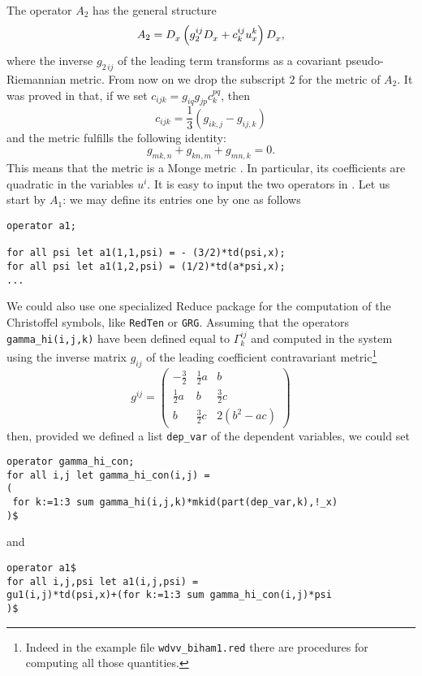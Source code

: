 The operator $A_2$ has the general structure
\begin{equation}
  A_2=D_x^{}\left(g^{ij}_2D_x^{}+c_{k}^{ij}u_{x}^{k}\right)D_x^{},  \label{casimir}
\end{equation}
where the inverse $g_{2\,ij}$ of the leading term transforms as a covariant
pseudo-Riemannian metric. From now on we drop the subscript $2$ for the metric
of $A_2$. It was proved in \cite{Ferapontov:2014} that, if we set
$c_{ijk}=g_{iq}g_{jp}c_{k}^{pq}$, then
\begin{displaymath}
  c_{ijk}=\frac{1}{3}(g_{ik,j}-g_{ij,k})
\end{displaymath}
and the metric fulfills the following identity:
\begin{equation}
  g_{mk,n}+g_{kn,m}+g_{mn,k}=0.
  \label{Killing}
\end{equation}
This means that the metric is a Monge metric \cite{Ferapontov:2014}. In particular, its
coefficients are quadratic in the variables $u^i$.
It is easy to input the two operators in \cde. Let us start by $A_1$: we may
define its entries one by one as follows
\begin{verbatim}
operator a1;

for all psi let a1(1,1,psi) = - (3/2)*td(psi,x);
for all psi let a1(1,2,psi) = (1/2)*td(a*psi,x);
...
\end{verbatim}
We could also use one specialized Reduce package for the computation of the
Christoffel symbols, like \texttt{RedTen} or \texttt{GRG}. Assuming that the
operators \texttt{gamma\_hi(i,j,k)} have been defined equal to $\Gamma^{ij}_k$
and computed in the system using the inverse matrix $g_{ij}$ of the leading
coefficient contravariant metric\footnote{Indeed in the example file
  \texttt{wdvv\_biham1.red} there are procedures for computing all those
  quantities.}
\begin{displaymath}
  g^{ij} =
  \begin{pmatrix}
    -\frac{3}{2} & \frac{1}{2}a & b
    \\
    \frac{1}{2}a & b & \frac{3}{2}c
    \\
    b & \frac{3}{2}c & 2(b^2-ac)
  \end{pmatrix}
\end{displaymath}
then, provided we defined a list \texttt{dep\_var} of the dependent variables,
we could set
\begin{verbatim}
operator gamma_hi_con;
for all i,j let gamma_hi_con(i,j) =
(
 for k:=1:3 sum gamma_hi(i,j,k)*mkid(part(dep_var,k),!_x)
)$
\end{verbatim}
and
\begin{verbatim}
operator a1$
for all i,j,psi let a1(i,j,psi) =
gu1(i,j)*td(psi,x)+(for k:=1:3 sum gamma_hi_con(i,j)*psi
)$
\end{verbatim}


